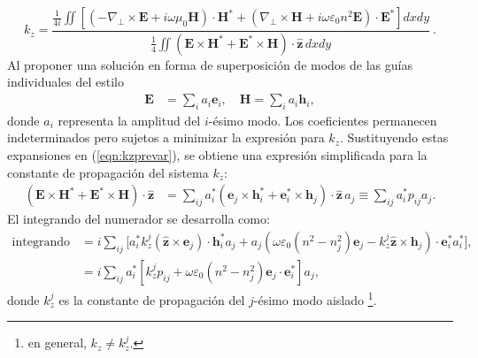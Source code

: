 \begin{equation}
	k_z = \frac{
		\frac{1}{4i} \iint \left[
		\left(-\nabla_\perp \times \textbf{E} + i\omega \mu_0 \textbf{H}\right) \cdot \textbf{H}^* 
		+ \left(\nabla_\perp \times \textbf{H} + i\omega \varepsilon_0 n^2 \textbf{E}\right) \cdot \textbf{E}^*
		\right] dxdy
	}{
		\frac{1}{4} \iint \left( 
		\textbf{E} \times \textbf{H}^* + \textbf{E}^* \times \textbf{H}
		\right) \cdot \hat{\textbf{z}} \, dxdy
	} \ . 
	\label{eqn:kzprevar}
\end{equation}
Al proponer una solución en forma de superposición de modos de las guías individuales del estilo
\begin{align*}
	\textbf{E} &= \sum_i a_i \textbf{e}_i, \quad \textbf{H} = \sum_i a_i \textbf{h}_i,
\end{align*}
donde $a_i$ representa la amplitud del $i$-ésimo modo. Los coeficientes permanecen indeterminados pero sujetos a minimizar la expresión para $k_z$. Sustituyendo estas expansiones en (\ref{eqn:kzprevar}), se obtiene una expresión simplificada para la constante de propagación del sistema $k_z$:
\begin{align*}
	(\textbf{E}\times\textbf{H}^* + \textbf{E}^*\times\textbf{H})\cdot\hat{\textbf{z}} 
	&= \sum_{ij} a_i^* \left( \textbf{e}_j \times \textbf{h}_i^* + \textbf{e}_i^* \times \textbf{h}_j \right) \cdot \hat{\textbf{z}} \, a_j 
	\equiv \sum_{ij} a_i^* p_{ij} a_j.
\end{align*}
El integrando del numerador se desarrolla como:
\begin{align*}
	\text{integrando numerador} &= i\sum_{ij} \Big[ a_i^* k_z^j (\hat{\textbf{z}}\times\textbf{e}_j )\cdot\textbf{h}_i^* a_j  + a_j \left(\omega \varepsilon_0 (n^2-n_j^2) \textbf{e}_j - k_z^j \hat{\textbf{z}}\times\textbf{h}_j \right) \cdot \textbf{e}_i^* a_i^* \Big], \\
	&= i\sum_{ij} a_i^* \left[ k_z^j p_{ij} + \omega \varepsilon_0(n^2-n_j^2) \textbf{e}_j \cdot \textbf{e}_i^* \right] a_j,
\end{align*}
donde $k_z^j$ es la constante de propagación del $j$-ésimo modo aislado \footnote{en general, $k_z \neq k_z^j$.}. 

